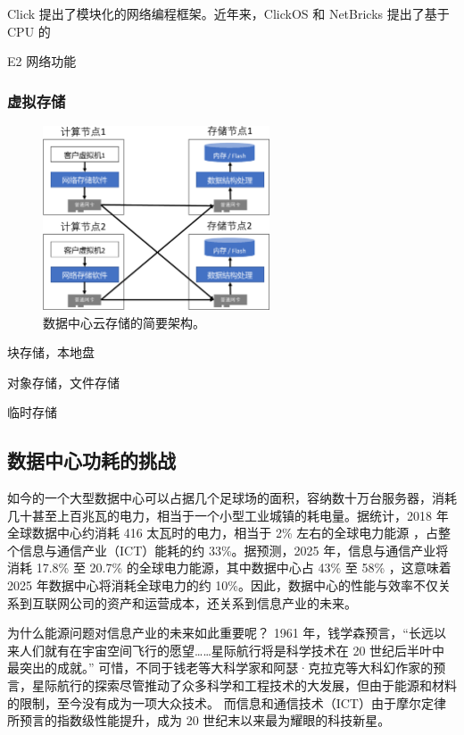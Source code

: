 Click \cite{kohler2000click} 提出了模块化的网络编程框架。近年来，ClickOS \cite{martins2014clickos} 和 NetBricks \cite{netbricks} 提出了基于 CPU 的

E2 \cite{palkar2015e2} 网络功能

\subsubsection{虚拟存储}




\begin{figure}[htbp]
	\centering
	\includegraphics[width=0.6\textwidth]{figures/storage_arch.pdf}
	\caption{数据中心云存储的简要架构。}
	\label{background:fig:storage_arch}
\end{figure}

块存储，本地盘

对象存储，文件存储

临时存储




\subsection{数据中心功耗的挑战}

如今的一个大型数据中心可以占据几个足球场的面积，容纳数十万台服务器，消耗几十甚至上百兆瓦的电力，相当于一个小型工业城镇的耗电量。据统计，2018 年全球数据中心约消耗 416 太瓦时的电力，相当于 2\% 左右的全球电力能源 \cite{datacenter-energy}，占整个信息与通信产业（ICT）能耗的约 33\%。据预测，2025 年，信息与通信产业将消耗 17.8\% 至 20.7\% 的全球电力能源，其中数据中心占 43\% 至 58\% \cite{power-consumption}，这意味着 2025 年数据中心将消耗全球电力的约 10\%。因此，数据中心的性能与效率不仅关系到互联网公司的资产和运营成本，还关系到信息产业的未来。

为什么能源问题对信息产业的未来如此重要呢？
1961 年，钱学森预言，``长远以来人们就有在宇宙空间飞行的愿望……星际航行将是科学技术在 20 世纪后半叶中最突出的成就。'' \cite{qianxuesen}
可惜，不同于钱老等大科学家和阿瑟·克拉克等大科幻作家的预言，星际航行的探索尽管推动了众多科学和工程技术的大发展，但由于能源和材料的限制，至今没有成为一项大众技术。
而信息和通信技术（ICT）由于摩尔定律所预言的指数级性能提升，成为 20 世纪末以来最为耀眼的科技新星。

